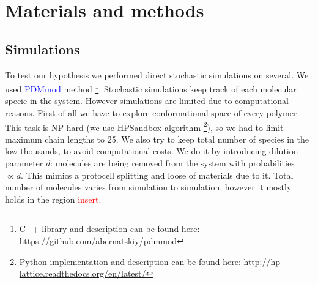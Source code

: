\documentclass[12pt]{paper}
\newcommand{\red}[1]{\textcolor{red}{#1}}
\newcommand{\blue}[1]{\textcolor{blue}{#1}}
\begin{document}
\section{Materials and methods}\label{sec:mat}
\subsection{Simulations}\label{sec:mat-sim}
To test our hypothesis we performed direct stochastic simulations on several. We used 
\blue{PDMmod} method \cite{Bernatskiy}\footnote{C++ library and description can be found 
here: \url{https://github.com/abernatskiy/pdmmod}}. Stochastic simulations keep track of each 
molecular specie in the system. However simulations are limited due to computational reasons. First 
of all we have to explore conformational space of every polymer. This task is NP-hard (we use 
HPSandbox algorithm\cite{lau1989lattice,Dill2008} \footnote{Python implementation and description 
can be found here: \url{http://hp-lattice.readthedocs.org/en/latest/}}), so we had to limit 
maximum chain lengths to 25. We also try to keep total number of species in the low thousands, to 
avoid computational costs. We do it by introducing dilution parameter $d$: molecules are being 
removed from the system with probabilities $\propto d$. This mimics a protocell splitting and 
loose of materials due to it. Total number of molecules varies from simulation to simulation, 
however it mostly holds in the region \red{insert}.
\end{document}

